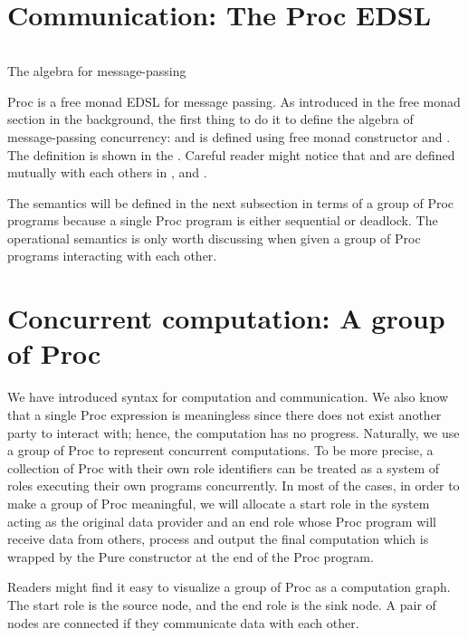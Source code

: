 \section{Communication: The Proc EDSL}
\begin{listing}[ht]
    \inputminted{Haskell}{spar/procf.hs}
    \caption{The algebra for message-passing}
    \label{spar:code:procf}
\end{listing}

Proc is a free monad EDSL for message passing. As introduced in the free monad section in the background, the first thing to do it to define the algebra of message-passing concurrency:  and  is defined using free monad constructor and . The definition is shown in the . Careful reader might notice that  and  are defined mutually with each others in ,  and .

The semantics will be defined in the next subsection in terms of a group of Proc programs because a single Proc program is either sequential or deadlock. The operational semantics is only worth discussing when given a group of Proc programs interacting with each other.

\section{Concurrent computation: A group of Proc}
We have introduced syntax for computation and communication. We also know that a single Proc expression is meaningless since there does not exist another party to interact with; hence, the computation has no progress. Naturally, we use a group of Proc to represent concurrent computations. To be more precise, a collection of Proc with their own role identifiers can be treated as a system of roles executing their own programs concurrently. In most of the cases, in order to make a group of Proc meaningful, we will allocate a start role in the system acting as the original data provider and an end role whose Proc program will receive data from others, process and output the final computation which is wrapped by the Pure constructor at the end of the Proc program. 

Readers might find it easy to visualize a group of Proc as a computation graph. The start role is the source node, and the end role is the sink node. A pair of nodes are connected if they communicate data with each other.
